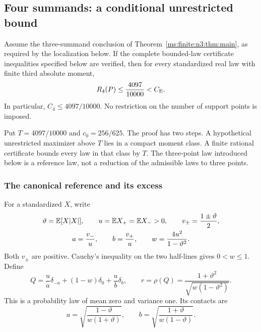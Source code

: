 \subsection{Four summands: a conditional unrestricted bound}\label{ms:finite:n4all:section}

\begin{theorem}\label{ms:finite:n4all:thm:main}
Assume the three-summand conclusion of Theorem~\ref{ms:finite:n3:thm:main}, as required by the localization below. If the complete bounded-law certificate inequalities specified below
are verified, then for every standardized real law with finite third absolute moment,
\[
 R_4(P)\le\frac{4097}{10000}<C_{\mathrm E}.
\]
In particular, $C_4\le4097/10000$. No restriction on the number of
support points is imposed.
\end{theorem}

Put $T=4097/10000$ and $c_0=256/625$. The proof has two steps.
A hypothetical unrestricted maximizer above $T$ lies in a compact
moment class. A finite rational certificate bounds every law in that
class by $T$. The three-point law introduced below is a reference law,
not a reduction of the admissible laws to three points.

\subsubsection{The canonical reference and its excess}
For a standardized $X$, write
\[
 \begin{gathered}
 \vartheta=\mathbb E[X|X|],\qquad u=\mathbb E X_+=\mathbb E X_->0,\qquad
 v_\pm=\frac{1\pm\vartheta}{2},\\
 a=\frac{v_-}{u},\qquad b=\frac{v_+}{u},\qquad
 w=\frac{4u^2}{1-\vartheta^2}.
 \end{gathered}
\]
Both $v_\pm$ are positive. Cauchy's inequality on the two half-lines
gives $0<w\le1$. Define
\begin{equation}\label{ms:finite:n4all:eq:reference}
 Q=\frac{u}{a}\delta_{-a}+(1-w)\delta_0+\frac{u}{b}\delta_b,
 \qquad
 r=\rho(Q)=\frac{1+\vartheta^2}{\sqrt{w(1-\vartheta^2)}}.
\end{equation}
This is a probability law of mean zero and variance one. Its contacts
are
\[
 a=\sqrt{\frac{1-\vartheta}{w(1+\vartheta)}},\qquad
 b=\sqrt{\frac{1+\vartheta}{w(1-\vartheta)}}.
\]

